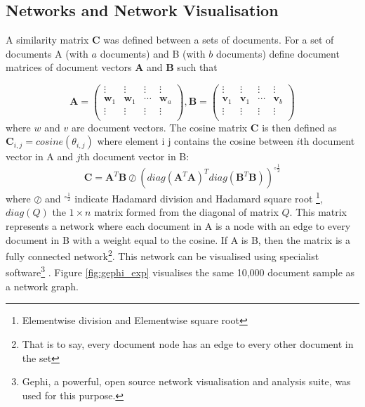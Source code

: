 \subsection{Networks and Network Visualisation}
\label{sec:COSINEMAT}
A similarity matrix $\mathbf{C}$ was defined between a sets of documents. For a set of documents  A (with $a$ documents) and B (with $b$ documents) define document matrices of document vectors $\mathbf{A}$ and $\mathbf{B}$ such that 

$$\mathbf{A} = \left( \begin{array}{cccc}
\vdots & \vdots & \vdots & \vdots \\
\mathbf{w}_1 & \mathbf{w}_1 & \cdots & \mathbf{w}_a \\
\vdots & \vdots & \vdots & \vdots \\ \end{array} \right) , \mathbf{B} = \left( \begin{array}{cccc}
\vdots & \vdots & \vdots & \vdots \\
\mathbf{v}_1 & \mathbf{v}_1 & \cdots & \mathbf{v}_b \\
\vdots & \vdots & \vdots & \vdots \\ \end{array} \right)$$ where $w$ and $v$ are document vectors.
The cosine matrix $\mathbf{C}$ is then defined as $\mathbf{C}_{i , j} = cosine \left(\theta_{i , j} \right)$ where element i j contains the cosine between $i$th document vector in A and $j$th document vector in B:
$$\mathbf{C}=\mathbf{A}^T \mathbf{B} \oslash \left( diag(\mathbf{A}^T \mathbf{A})^T diag(\mathbf{B}^T \mathbf{B}) \right)^{\circ\frac12}$$
where $\oslash$ and $^{\circ\frac12}$ indicate Hadamard division and Hadamard square root \footnote{Elementwise division and Elementwise square root}, $diag(Q)$ the $1 \times n$ matrix formed from the diagonal of matrix $Q$. This matrix represents a network where each document in A is a node with an edge to every document in B with a weight equal to the cosine. If A is B, then the matrix is a fully connected network\footnote{That is to say, every document node has an edge to every other document in the set}. This network can be visualised using specialist software\footnote{Gephi, a powerful, open source network visualisation and analysis suite, was used for this purpose. } \cite{gephi}. Figure \ref{fig:gephi_exp} visualises the same 10,000 document sample as a network graph.
